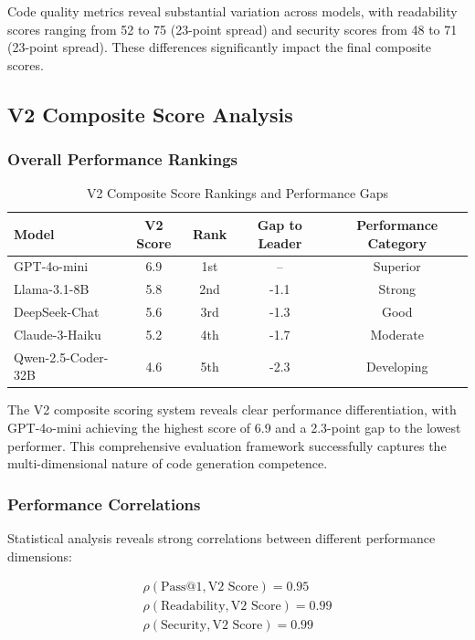 \documentclass[conference]{IEEEtran}
\begin{document}
Code quality metrics reveal substantial variation across models, with readability scores ranging from 52 to 75 (23-point spread) and security scores from 48 to 71 (23-point spread). These differences significantly impact the final composite scores.

\subsection{V2 Composite Score Analysis}

\subsubsection{Overall Performance Rankings}

\begin{table}[ht]
\centering
\caption{V2 Composite Score Rankings and Performance Gaps}
\begin{tabular}{lcccc}
\toprule
\textbf{Model} & \textbf{V2 Score} & \textbf{Rank} & \textbf{Gap to Leader} & \textbf{Performance Category} \\
\midrule
GPT-4o-mini & 6.9 & 1st & -- & Superior \\
Llama-3.1-8B & 5.8 & 2nd & -1.1 & Strong \\
DeepSeek-Chat & 5.6 & 3rd & -1.3 & Good \\
Claude-3-Haiku & 5.2 & 4th & -1.7 & Moderate \\
Qwen-2.5-Coder-32B & 4.6 & 5th & -2.3 & Developing \\
\bottomrule
\end{tabular}
\label{tab:v2_scores}
\end{table}

The V2 composite scoring system reveals clear performance differentiation, with GPT-4o-mini achieving the highest score of 6.9 and a 2.3-point gap to the lowest performer. This comprehensive evaluation framework successfully captures the multi-dimensional nature of code generation competence.

\subsubsection{Performance Correlations}

Statistical analysis reveals strong correlations between different performance dimensions:

\begin{align}
\rho(\text{Pass@1}, \text{V2 Score}) = 0.95 \\
\rho(\text{Readability}, \text{V2 Score}) = 0.99 \\
\rho(\text{Security}, \text{V2 Score}) = 0.99
\end{align}
\end{document}
